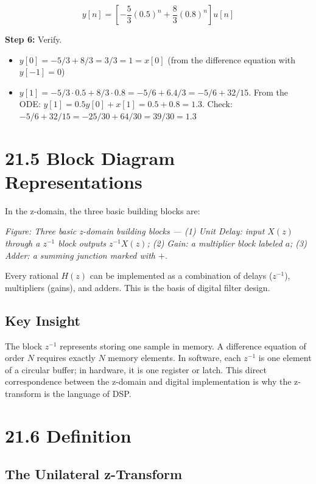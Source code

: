 \documentclass[11pt]{article}
\begin{document}
\[y[n] = \left[-\frac{5}{3}(0.5)^n + \frac{8}{3}(0.8)^n\right] u[n]\]

\textbf{Step 6:} Verify.

\begin{itemize}
  \item $y[0] = -5/3 + 8/3 = 3/3 = 1 = x[0]$ \checkmark (from the difference equation with $y[-1] = 0$)
  \item $y[1] = -5/3 \cdot 0.5 + 8/3 \cdot 0.8 = -5/6 + 6.4/3 = -5/6 + 32/15$. From the ODE: $y[1] = 0.5 y[0] + x[1] = 0.5 + 0.8 = 1.3$. Check: $-5/6 + 32/15 = -25/30 + 64/30 = 39/30 = 1.3$ \checkmark
\end{itemize}

\section*{21.5 Block Diagram Representations}

In the z-domain, the three basic building blocks are:

\textit{Figure: Three basic z-domain building blocks — (1) Unit Delay: input $X(z)$ through a $z^{-1}$ block outputs $z^{-1} X(z)$; (2) Gain: a multiplier block labeled $a$; (3) Adder: a summing junction marked with $+$.}

Every rational $H(z)$ can be implemented as a combination of delays ($z^{-1}$), multipliers (gains), and adders. This is the basis of digital filter design.

\subsection*{Key Insight}

The block $z^{-1}$ represents storing one sample in memory. A difference equation of order $N$ requires exactly $N$ memory elements. In software, each $z^{-1}$ is one element of a circular buffer; in hardware, it is one register or latch. This direct correspondence between the z-domain and digital implementation is why the z-transform is the language of DSP.

\section*{21.6 Definition}

\subsection*{The Unilateral z-Transform}
\end{document}
